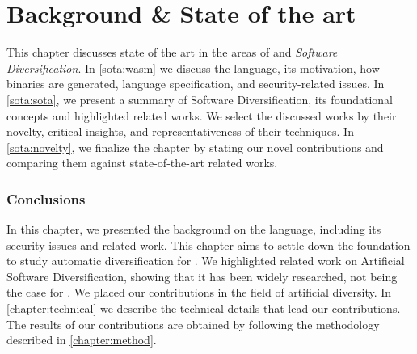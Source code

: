 \chapter{Background \& State of the art}

This chapter discusses state of the art in the areas of \emph{\wasm} and \emph{Software Diversification}. In \autoref{sota:wasm} we discuss the \wasm language, its motivation, how \wasm binaries are generated, language specification, and security-related issues. In \autoref{sota:sota}, we present a summary of Software Diversification, its foundational concepts and highlighted related works.  
We select the discussed works by their novelty, critical insights, and representativeness of their techniques. 
In \autoref{sota:novelty}, we finalize the chapter by stating our novel contributions and comparing them against state-of-the-art related works.







\subsection*{Conclusions}
In this chapter, we presented the background on the \wasm language, including its security issues and related work.
This chapter aims to settle down the foundation to study automatic diversification for \wasm. 
We highlighted related work on Artificial Software Diversification, showing that it has been widely researched, not being the case for \wasm. 
We placed our contributions in the field of artificial diversity. 
In \autoref{chapter:technical} we describe the technical details that lead our contributions. 
The results of our contributions are obtained by following the methodology described in \autoref{chapter:method}.
